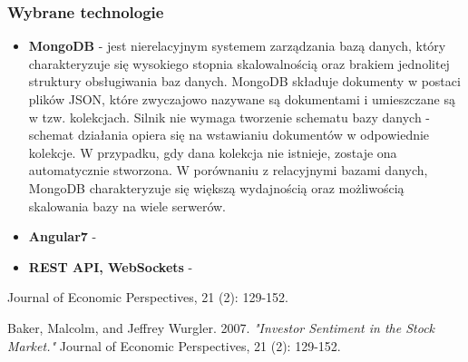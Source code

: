 \subsubsection{Wybrane technologie}
\begin{itemize}
    \item {\textbf{MongoDB} - jest nierelacyjnym systemem zarządzania bazą danych, który charakteryzuje się wysokiego stopnia skalowalnością oraz brakiem jednolitej struktury obsługiwania baz danych. MongoDB składuje dokumenty w postaci plików JSON, które zwyczajowo nazywane są dokumentami i umieszczane są w tzw. kolekcjach. Silnik nie wymaga tworzenie schematu bazy danych - schemat działania opiera się na wstawianiu dokumentów w odpowiednie kolekcje. W przypadku, gdy dana kolekcja nie istnieje, zostaje ona automatycznie stworzona. W porównaniu z relacyjnymi bazami danych, MongoDB charakteryzuje się większą wydajnością oraz możliwością skalowania bazy na wiele serwerów.}
    \item {\textbf{Angular7} - }
    \item {\textbf{REST API, WebSockets} - }
\end{itemize} Journal of Economic Perspectives, 21 (2): 129-152.

\begin{thebibliography}{9}
Baker, Malcolm, and Jeffrey Wurgler. 2007. 
\textit{"Investor Sentiment in the Stock Market."}
 Journal of Economic Perspectives, 21 (2): 129-152.
\end{thebibliography}
